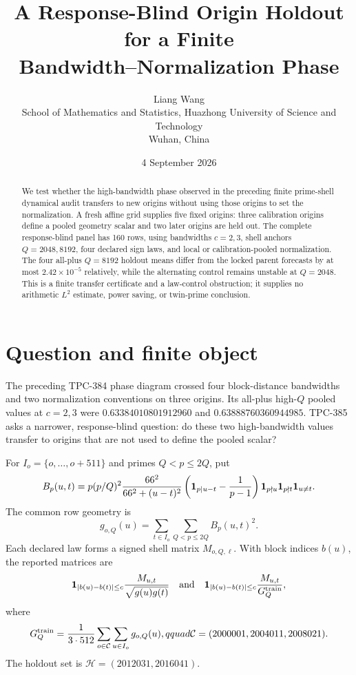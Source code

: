 \documentclass[10pt]{article}
\title{A Response-Blind Origin Holdout for a Finite\\
Bandwidth--Normalization Phase}
\author{Liang Wang\\
School of Mathematics and Statistics, Huazhong University of Science and Technology\\
Wuhan, China}
\date{4 September 2026}
\begin{document}
\maketitle

\begin{abstract}
We test whether the high-bandwidth phase observed in the preceding finite
prime-shell dynamical audit transfers to new origins without using those
origins to set the normalization.  A fresh affine grid supplies five fixed
origins: three calibration origins define a pooled geometry scalar and two
later origins are held out.  The complete response-blind panel has 160 rows,
using bandwidths $c=2,3$, shell anchors $Q=2048,8192$, four declared sign
laws, and local or calibration-pooled normalization.  The four all-plus
$Q=8192$ holdout means differ from the locked parent forecasts by at most
$2.42\times 10^{-5}$ relatively, while the alternating control remains
unstable at $Q=2048$.  This is a finite transfer certificate and a law-control
obstruction; it supplies no arithmetic $L^2$ estimate, power saving, or
twin-prime conclusion.
\end{abstract}

\section{Question and finite object}

The preceding TPC-384 phase diagram crossed four block-distance bandwidths and
two normalization conventions on three origins.  Its all-plus high-$Q$
pooled values at $c=2,3$ were $0.63384010801912960$ and
$0.63888760360944985$.  TPC-385 asks a narrower, response-blind question:
do these two high-bandwidth values transfer to origins that are not used to
define the pooled scalar?

For $I_o=\{o,\ldots,o+511\}$ and primes $Q<p\leq 2Q$, put
\[
B_p(u,t)=p(p/Q)^2\frac{66^2}{66^2+(u-t)^2}
\left({\bf1}_{p\mid u-t}-\frac{1}{p-1}\right)
{\bf1}_{p\nmid u}{\bf1}_{p\nmid t}{\bf1}_{u\ne t}.
\]
The common row geometry is
\[
 g_{o,Q}(u)=\sum_{t\in I_o}\sum_{Q<p\leq2Q}B_p(u,t)^2.
\]
Each declared law forms a signed shell matrix $M_{o,Q,\ell}$.  With block
indices $b(u)$, the reported matrices are
\[
 {\bf1}_{|b(u)-b(t)|\leq c}\frac{M_{u,t}}{\sqrt{g(u)g(t)}}
 \quad\text{and}\quad
 {\bf1}_{|b(u)-b(t)|\leq c}\frac{M_{u,t}}{G_Q^{\rm train}},
\]
where
\[
G_Q^{\rm train}=\frac{1}{3\cdot512}
\sum_{o\in\mathcal C}\sum_{u\in I_o}g_{o,Q}(u),qquad
\mathcal C=(2000001,2004011,2008021).
\]
The holdout set is
$\mathcal H=(2012031,2016041)$.
\end{document}
